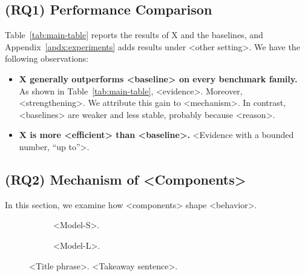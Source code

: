\subsection{(RQ1) Performance Comparison} \label{sec:main-performance}
Table~\ref{tab:main-table} reports the results of X and the baselines, and Appendix~\ref{apdx:experiments} adds results under <other setting>.
We have the following observations:
\begin{itemize}[leftmargin=*]
    \item \textbf{\draft{[Expected]} X generally outperforms <baseline> on every benchmark family.}
    As shown in Table~\ref{tab:main-table}, <evidence>. Moreover, <strengthening>.
    We attribute this gain to <mechanism>.
    In contrast, <baselines> are weaker and less stable, probably because <reason>.
    \item \textbf{\draft{[Expected]} X is more <efficient> than <baseline>.}
    <Evidence with a bounded number, \eg ``up to''>.
\end{itemize}

\subsection{(RQ2) Mechanism of <Components>} \label{sec:mechanism}
In this section, we examine how <components> shape <behavior>.

\begin{figure}[t]
    \centering
    \begin{subfigure}[t]{0.49\linewidth}
        \centering
        \vspace{-6pt}
        \caption{<Model-S>.}
        \label{fig:mechanism-a}
    \end{subfigure}
    \hfill
    \begin{subfigure}[t]{0.49\linewidth}
        \centering
        \vspace{-6pt}
        \caption{<Model-L>.}
        \label{fig:mechanism-b}
    \end{subfigure}
    \vspace{-8pt}
    \caption{<Title phrase>. <Takeaway sentence>.}
    \label{fig:mechanism}
    \vspace{-12pt}
\end{figure}


